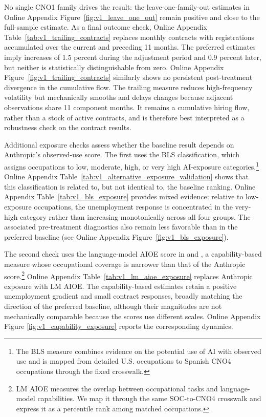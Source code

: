 No single CNO1 family drives the result: the leave-one-family-out estimates in Online Appendix Figure~\ref{fig:v1_leave_one_out} remain positive and close to the full-sample estimate. As a final outcome check, Online Appendix Table~\ref{tab:v1_trailing_contracts} replaces monthly contracts with registrations accumulated over the current and preceding 11 months. The preferred estimates imply increases of 1.5 percent during the adjustment period and 0.9 percent later, but neither is statistically distinguishable from zero. Online Appendix Figure~\ref{fig:v1_trailing_contracts} similarly shows no persistent post-treatment divergence in the cumulative flow. The trailing measure reduces high-frequency volatility but mechanically smooths and delays changes because adjacent observations share 11 component months. It remains a cumulative hiring flow, rather than a stock of active contracts, and is therefore best interpreted as a robustness check on the contract results.

Additional exposure checks assess whether the baseline result depends on Anthropic's observed-use score. The first uses the BLS classification, which assigns occupations to low, moderate, high, or very high AI-exposure categories.\footnote{The BLS measure combines evidence on the potential use of AI with observed use and is mapped from detailed U.S. occupations to Spanish CNO4 occupations through the fixed crosswalk.} Online Appendix Table~\ref{tab:v1_alternative_exposure_validation} shows that this classification is related to, but not identical to, the baseline ranking. Online Appendix Table~\ref{tab:v1_bls_exposure} provides mixed evidence: relative to low-exposure occupations, the unemployment response is concentrated in the very-high category rather than increasing monotonically across all four groups. The associated pre-treatment diagnostics also remain less favorable than in the preferred baseline (see Online Appendix Figure~\ref{fig:v1_bls_exposure}).

The second check uses the language-model AIOE score in \citet{felten_raj_seamans_2021} and \citet{felten_raj_seamans_2023}, a capability-based measure whose occupational coverage is narrower than that of the Anthropic score.\footnote{LM AIOE measures the overlap between occupational tasks and language-model capabilities. We map it through the same SOC-to-CNO4 crosswalk and express it as a percentile rank among matched occupations.} Online Appendix Table~\ref{tab:v1_lm_aioe_exposure} replaces Anthropic exposure with LM AIOE. The capability-based estimates retain a positive unemployment gradient and small contract responses, broadly matching the direction of the preferred baseline, although their magnitudes are not mechanically comparable because the scores use different scales. Online Appendix Figure \ref{fig:v1_capability_exposure} reports the corresponding dynamics.


